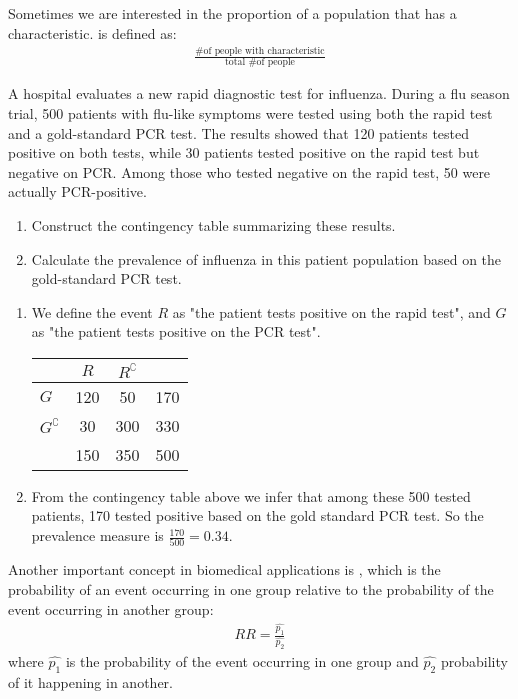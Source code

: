 Sometimes we are interested in the proportion of a population that has a characteristic.
 is defined as:
\begin{gather*}
	\frac{\text{\# of people with characteristic}}{\text{total \# of people}}
\end{gather*}

\begin{exmp}
	A hospital evaluates a new rapid diagnostic test for influenza.
	During a flu season trial, 500 patients with flu-like symptoms were tested using both the rapid test and a gold-standard PCR test.
	The results showed that 120 patients tested positive on both tests,
	while 30 patients tested positive on the rapid test but negative on PCR.
	Among those who tested negative on the rapid test,
	50 were actually PCR-positive.
	\begin{enumerate}
		\item Construct the contingency table summarizing these results.
		\item Calculate the prevalence of influenza in this patient population based on the gold-standard PCR test.
	\end{enumerate}
\end{exmp}
\begin{solution}
	\begin{enumerate}
	\item We define the event \( R \) as "the patient tests positive on the rapid test", and \( G \) as "the patient tests positive on the PCR test".
	\begin{center}
	\begin{tabular}{l|cc|c}
						& \( R \) & \( R^\complement \) &  \\ \hline
	\( G \)                & 120 & 50 & 170\\ 
	\( G^\complement \)    & 30 & 300 & 330 \\ \hline
						& 150 & 350 & 500
	\end{tabular}
	\end{center}
	\item From the contingency table above we infer that among these 500 tested patients, 170 tested positive based on the gold standard PCR test.
	So the prevalence measure is \( \frac{170}{500} = 0.34 \).
	\end{enumerate}
\end{solution}

Another important concept in biomedical applications is ,
which is the probability of an event occurring in one group relative to the probability of the event occurring in another group:
\begin{gather*}
	RR = \frac{\hat{p_1}}{\hat{p_2}}
\end{gather*}
where \( \hat{p_1} \) is the probability of the event occurring in one group and \( \hat{p_2} \) probability of it happening in another.

